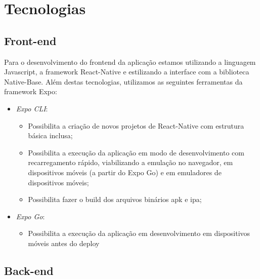 \chapter{Tecnologias}

\section{Front-end}
Para o desenvolvimento do \gls{frontend} da aplicação estamos utilizando a linguagem Javascript, a \gls{framework} React-Native e estilizando a interface com a biblioteca Native-Base.
Além destas tecnologias, utilizamos as seguintes ferramentas da \gls{framework} Expo:

\begin{itemize}
	\item \textit{Expo CLI}:
		\begin{itemize}
			\item Possibilita a criação de novos projetos de React-Native com estrutura básica inclusa;
			\item Possibilita a execução da aplicação em modo de desenvolvimento com recarregamento rápido, viabilizando a emulação no navegador, em dispositivos móveis (a partir do Expo Go) e em emuladores de dispositivos móveis;
			
			\item Possibilita fazer o \gls{build} dos arquivos binários \gls{apk} e \gls{ipa};
		\end{itemize}
		
			\item \textit{Expo Go}:
		\begin{itemize}
			\item Possibilita a execução da aplicação em desenvolvimento em dispositivos móveis antes do \gls{deploy}
		\end{itemize}
\end{itemize}

\section{Back-end}